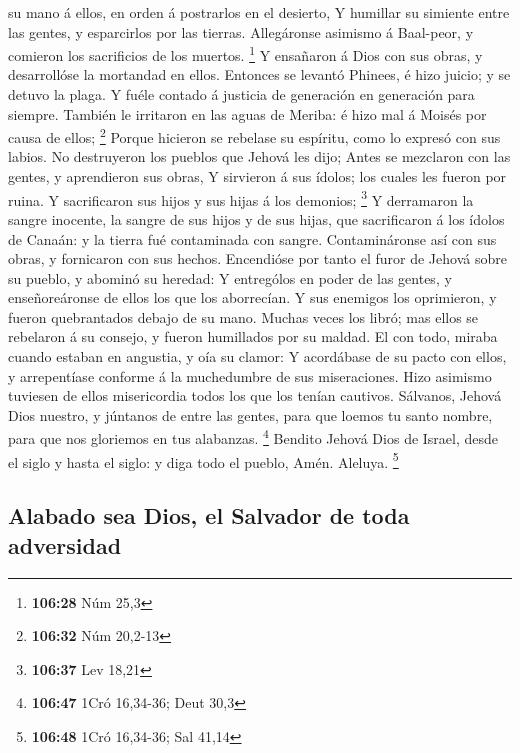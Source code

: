 su mano á ellos, en orden á postrarlos en el desierto,  Y
humillar su simiente entre las gentes, y esparcirlos por las tierras.
 Allegáronse asimismo á Baal-peor, y comieron los
sacrificios de los muertos. \footnote{\textbf{106:28} Núm 25,3}
 Y ensañaron á Dios con sus obras, y desarrollóse la
mortandad en ellos.  Entonces se levantó Phinees, é hizo
juicio; y se detuvo la plaga.  Y fuéle contado á justicia
de generación en generación para siempre.  También le
irritaron en las aguas de Meriba: é hizo mal á Moisés por causa de
ellos; \footnote{\textbf{106:32} Núm 20,2-13}  Porque
hicieron se rebelase su espíritu, como lo expresó con sus labios.
 No destruyeron los pueblos que Jehová les dijo;
 Antes se mezclaron con las gentes, y aprendieron sus
obras,  Y sirvieron á sus ídolos; los cuales les fueron por
ruina.  Y sacrificaron sus hijos y sus hijas á los
demonios; \footnote{\textbf{106:37} Lev 18,21}  Y
derramaron la sangre inocente, la sangre de sus hijos y de sus hijas,
que sacrificaron á los ídolos de Canaán: y la tierra fué contaminada con
sangre.  Contamináronse así con sus obras, y fornicaron con
sus hechos.  Encendióse por tanto el furor de Jehová sobre
su pueblo, y abominó su heredad:  Y entrególos en poder de
las gentes, y enseñoreáronse de ellos los que los aborrecían.
 Y sus enemigos los oprimieron, y fueron quebrantados
debajo de su mano.  Muchas veces los libró; mas ellos se
rebelaron á su consejo, y fueron humillados por su maldad. 
El con todo, miraba cuando estaban en angustia, y oía su clamor:
 Y acordábase de su pacto con ellos, y arrepentíase
conforme á la muchedumbre de sus miseraciones.  Hizo
asimismo tuviesen de ellos misericordia todos los que los tenían
cautivos.  Sálvanos, Jehová Dios nuestro, y júntanos de
entre las gentes, para que loemos tu santo nombre, para que nos
gloriemos en tus alabanzas. \footnote{\textbf{106:47} 1Cró 16,34-36;
  Deut 30,3}  Bendito Jehová Dios de Israel, desde el siglo
y hasta el siglo: y diga todo el pueblo, Amén. Aleluya. \footnote{\textbf{106:48}
  1Cró 16,34-36; Sal 41,14}

\hypertarget{alabado-sea-dios-el-salvador-de-toda-adversidad}{%
\subsection{Alabado sea Dios, el Salvador de toda
adversidad}\label{alabado-sea-dios-el-salvador-de-toda-adversidad}}

